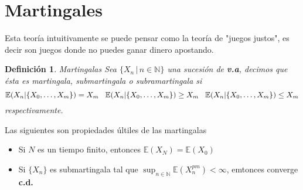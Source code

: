\documentclass[letterpaper]{article}
\newtheorem{def.}{Definici\'on}[section]
\newcommand{\nat}{\ensuremath{ \mathbb N }}
\newcommand{\esp}{\mathbb E}
\begin{document}
\section{Martingales}
\label{sec:org55d0f5e}
\noindent Esta teoría intuitivamente se puede pensar como la teoría de "juegos justos", es decir son juegos donde no puedes ganar dinero apostando.
\begin{def.}{Martingalas}
Sea \(\{X_n\,\vert\,n\in\nat\}\) una sucesión de \textbf{v.a}, decimos que ésta es \emph{martingala, submartingala o subramartingala} si
\[
    \esp(X_n|\{X_0,\dots,X_m\})=X_m\hspace{0.3cm}\esp(X_n|\{X_0,\dots,X_m\})\geq X_m\hspace{0.3cm}\esp(X_n|\{X_0,\dots,X_m\})\leq X_m
\]
respectivamente.
\end{def.}
\noindent Las siguientes son propiedades últiles de las martingalas

\begin{itemize}
\item Si \(N\) es un tiempo finito, entonces \(\esp(X_N)=\esp(X_0)\)
\item Si \(\{X_n\}\) es submartingala tal que \(\sup_{n\in\nat}\esp(X^{pm}_n)<\infty\), emtonces converge \textbf{c.d.}
\end{itemize}
\end{document}
